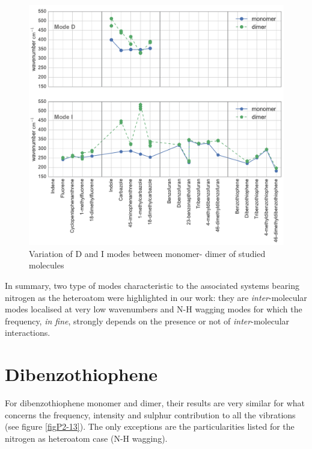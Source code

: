 	
	\begin{figure}[H]
		\begin{center}
			\includegraphics[scale=0.33]{image/P2-12}
		\end{center}
		\caption{Variation of D and I modes between monomer- dimer of studied molecules} \label{figP2-12}
	\end{figure}
	
	
	In summary, two type of modes characteristic to the associated systems bearing nitrogen as the heteroatom were highlighted in our work: they are \textit{inter}-molecular modes localised at very low wavenumbers and N-H wagging modes for which the frequency, \textit{in fine}, strongly depends on the presence or not of \textit{inter}-molecular interactions. 
	
	
	
	\section{Dibenzothiophene}
	
	
	For dibenzothiophene monomer and dimer, their results are very similar for what concerns the frequency, intensity and sulphur contribution to all the vibrations (see figure \ref{figP2-13}). The only exceptions are the particularities listed for the nitrogen as heteroatom case (N-H wagging).
	
